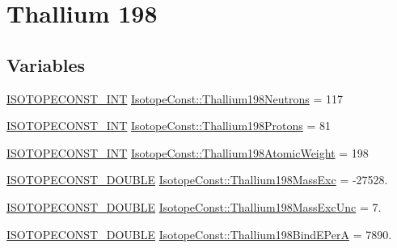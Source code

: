 \hypertarget{group___isotope_const-_thallium-_tl198}{}\section{Thallium 198}
\label{group___isotope_const-_thallium-_tl198}
\subsection*{Variables}
\begin{DoxyCompactItemize}
\item 
\mbox{\hyperlink{group___isotope_const-_macros_ga5f18360b3e99483a35c32d789e62621c}{I\+S\+O\+T\+O\+P\+E\+C\+O\+N\+S\+T\+\_\+\+I\+NT}} \mbox{\hyperlink{group___isotope_const-_thallium-_tl198_ga226fd7d63215e966af0527f3e93dc953}{Isotope\+Const\+::\+Thallium198\+Neutrons}} = 117
\item 
\mbox{\hyperlink{group___isotope_const-_macros_ga5f18360b3e99483a35c32d789e62621c}{I\+S\+O\+T\+O\+P\+E\+C\+O\+N\+S\+T\+\_\+\+I\+NT}} \mbox{\hyperlink{group___isotope_const-_thallium-_tl198_gac02464e36b3e0f8422f8c917e53c3702}{Isotope\+Const\+::\+Thallium198\+Protons}} = 81
\item 
\mbox{\hyperlink{group___isotope_const-_macros_ga5f18360b3e99483a35c32d789e62621c}{I\+S\+O\+T\+O\+P\+E\+C\+O\+N\+S\+T\+\_\+\+I\+NT}} \mbox{\hyperlink{group___isotope_const-_thallium-_tl198_ga1378388e452a74f6c933116f8b3b81ee}{Isotope\+Const\+::\+Thallium198\+Atomic\+Weight}} = 198
\item 
\mbox{\hyperlink{group___isotope_const-_macros_ga8f45a7272ce02c0b4c65c44636ed719a}{I\+S\+O\+T\+O\+P\+E\+C\+O\+N\+S\+T\+\_\+\+D\+O\+U\+B\+LE}} \mbox{\hyperlink{group___isotope_const-_thallium-_tl198_ga43eb1c57cb4f748b30a67e7d787cc1bd}{Isotope\+Const\+::\+Thallium198\+Mass\+Exc}} = -\/27528.
\item 
\mbox{\hyperlink{group___isotope_const-_macros_ga8f45a7272ce02c0b4c65c44636ed719a}{I\+S\+O\+T\+O\+P\+E\+C\+O\+N\+S\+T\+\_\+\+D\+O\+U\+B\+LE}} \mbox{\hyperlink{group___isotope_const-_thallium-_tl198_ga566fc9d7e4c13642af1c76a1a555ae47}{Isotope\+Const\+::\+Thallium198\+Mass\+Exc\+Unc}} = 7.
\item 
\mbox{\hyperlink{group___isotope_const-_macros_ga8f45a7272ce02c0b4c65c44636ed719a}{I\+S\+O\+T\+O\+P\+E\+C\+O\+N\+S\+T\+\_\+\+D\+O\+U\+B\+LE}} \mbox{\hyperlink{group___isotope_const-_thallium-_tl198_ga6eea6e0d2868a86f4502feb39d174e3e}{Isotope\+Const\+::\+Thallium198\+Bind\+E\+PerA}} = 7890.
\item 

\end{DoxyCompactItemize}

